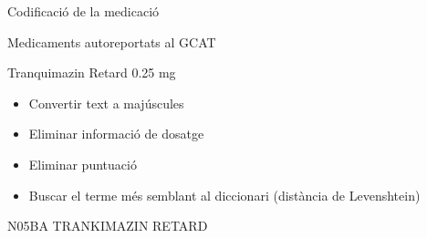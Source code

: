 \documentclass[ignorenonframetext,]{beamer}
\providecommand{\tightlist}{%
\setlength{\itemsep}{0pt}\setlength{\parskip}{0pt}}
\begin{document}
\begin{frame}{Codificació de la medicació}

\begin{block}{Medicaments autoreportats al GCAT}

Tranquimazin Retard 0.25 mg

\begin{itemize}
\tightlist
\item
  Convertir text a majúscules
\item
  Eliminar informació de dosatge
\item
  Eliminar puntuació
\item
  Buscar el terme més semblant al diccionari (distància de Levenshtein)
\end{itemize}

N05BA TRANKIMAZIN RETARD

\end{block}

\end{frame}
\end{document}
